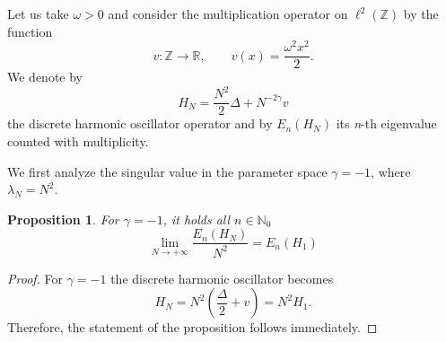 \documentclass[12pt, reqno]{amsart}
\newtheorem{proposition}[theorem]{Proposition}
\theoremstyle{definition}
\numberwithin{equation}{section}
\begin{document}
Let us take $\omega >0$ and consider the multiplication operator on $\ell^2(\mathbb{Z})$ by the function $$v\colon \mathbb{Z}\to\mathbb{R},\qquad v(x) = \frac{\omega^2 x^2}{2}.$$
We denote by $$H_N = \frac{N^2}{2}\Delta + N^{-2\gamma}v$$ the discrete harmonic oscillator operator and by $E_{n}(H_N)$ its \textit{n}-th eigenvalue counted with multiplicity. 
 
 We first analyze the singular value in the parameter space $\gamma= -1$, where $\lambda_N = N^2$.  
 \begin{proposition}\label{prop: -1}
 	For  $\gamma = -1$, it holds all $n\in\mathbb{N}_0$ 
    \begin{equation*}
 		\lim_{N\to+\infty}\frac{E_n(H_N)}{N^2} = E_n(H_1) 
 	\end{equation*}
 \end{proposition} 
 \begin{proof}
 	For $\gamma= -1$ the discrete harmonic oscillator becomes \begin{equation*}
 		H_N = N^2\left(\frac{\Delta}{2} +v\right) = N^2 H_1.
 	\end{equation*}Therefore, the statement of the proposition follows immediately.
 \end{proof}
 
\end{document}
